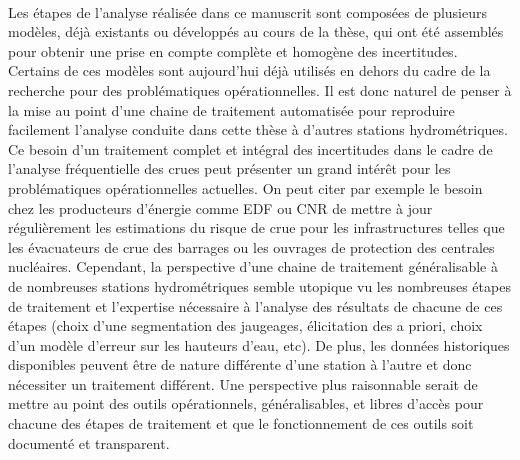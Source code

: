 		\paragraph{} Les étapes de l'analyse réalisée dans ce manuscrit sont composées de plusieurs modèles, déjà existants ou développés au cours de la thèse, qui ont été assemblés pour obtenir une prise en compte complète et homogène des incertitudes. Certains de ces modèles sont aujourd'hui déjà utilisés en dehors du cadre de la recherche pour des problématiques opérationnelles. Il est donc naturel de penser à la mise au point d'une chaine de traitement automatisée pour reproduire facilement l'analyse conduite dans cette thèse à d'autres stations hydrométriques. Ce besoin d'un traitement complet et intégral des incertitudes dans le cadre de l'analyse fréquentielle des crues peut présenter un grand intérêt pour les problématiques opérationnelles actuelles. On peut citer par exemple le besoin chez les producteurs d'énergie comme EDF ou CNR de mettre à jour régulièrement les estimations du risque de crue pour les infrastructures telles que les évacuateurs de crue des barrages ou les ouvrages de protection des centrales nucléaires. Cependant, la perspective d'une chaine de traitement généralisable à de nombreuses stations hydrométriques semble utopique vu les nombreuses étapes de traitement et l'expertise nécessaire à l'analyse des résultats de chacune de ces étapes (choix d'une segmentation des jaugeages, élicitation des a priori, choix d'un modèle d'erreur sur les hauteurs d'eau, etc). De plus, les données historiques disponibles peuvent être de nature différente d'une station à l'autre et donc nécessiter un traitement différent. Une perspective plus raisonnable serait de mettre au point des outils opérationnels, généralisables, et libres d'accès pour chacune des étapes de traitement et que le fonctionnement de ces outils soit documenté et transparent. 

	
